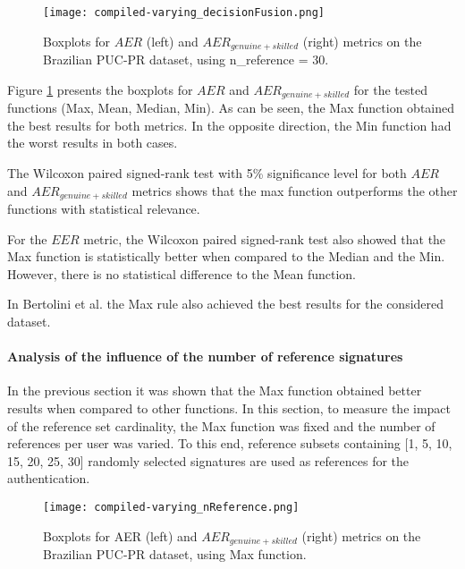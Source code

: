 \documentclass[conference]{IEEEtran}
\begin{document}

\begin{figure}[!htb]
\centering
  \texttt{[image: compiled-varying\_decisionFusion.png]}
  \caption{Boxplots for $AER$ (left) and $AER_{genuine+skilled}$ (right) metrics on the Brazilian PUC-PR dataset, using n\_reference = 30.}
  \label{fig:varying_decisionFusion}
\end{figure}

Figure \ref{fig:varying_decisionFusion} presents the boxplots for $AER$ and $AER_{genuine+skilled}$ for the tested functions (Max, Mean, Median, Min). As can be seen, the Max function obtained the best results for both metrics. In the opposite direction, the Min function had the worst results in both cases.

The Wilcoxon paired signed-rank test with 5\% significance level for both $AER$ and $AER_{genuine+skilled}$ metrics shows that the max function outperforms the other functions with statistical relevance. 

For the $EER$ metric, the Wilcoxon paired signed-rank test also showed that the Max function is statistically better when compared to the Median and the Min. However, there is no statistical difference to the Mean function.

In Bertolini et al. \cite{bertolini:10} the Max rule also achieved the best results for the considered dataset.

\paragraph{Analysis of the influence of the number of reference signatures}
In the previous section it was shown that the Max function obtained better results when compared to other functions. 
In this section, to measure the impact of the reference set cardinality, the Max function was fixed and the number of references per user was varied. To this end, reference subsets containing [1, 5, 10, 15, 20, 25, 30] randomly selected signatures are used as references for the authentication.

\begin{figure}[!htb]
\centering
  \texttt{[image: compiled-varying\_nReference.png]}
  \caption{Boxplots for AER (left) and $AER_{genuine+skilled}$ (right) metrics on the Brazilian PUC-PR dataset, using Max function.}
  \label{fig:varying_nReference}
\end{figure}
\end{document}
